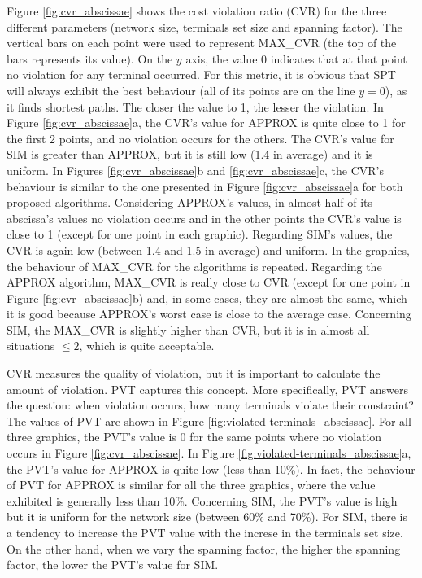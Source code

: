 
Figure \ref{fig:cvr_abscissae} shows the cost violation ratio (CVR) for the three different parameters
(network size, terminals set size and spanning factor). The vertical bars on each point were used to represent MAX\_CVR
(the top of the bars represents its value). On the $y$ axis, the value 0 indicates that at that point no violation for any terminal occurred. 
For this metric, it is obvious that SPT will always exhibit the best behaviour (all of its points are on the line $y = 0$), 
as it finds shortest paths. The closer the value to 1, the lesser the violation. 
In Figure \ref{fig:cvr_abscissae}a, the CVR's value for APPROX is quite close to 1 for the first 2 points, 
and no violation occurs for the others. 
The CVR's value for SIM is greater than APPROX, but it is still low (1.4 in average) and it is uniform. In Figures \ref{fig:cvr_abscissae}b and \ref{fig:cvr_abscissae}c, 
the CVR's behaviour is similar to the one presented in Figure \ref{fig:cvr_abscissae}a for both proposed algorithms. Considering APPROX's values, 
in almost half of its abscissa's values no violation occurs and in the other points the CVR's value is close to 1 (except for one point in each graphic). 
Regarding SIM's values, the CVR is again low (between 1.4 and 1.5 in average) and uniform. In the graphics, the behaviour of MAX\_CVR for the algorithms is repeated. 
Regarding the APPROX algorithm, MAX\_CVR is really close to CVR (except for one point in Figure \ref{fig:cvr_abscissae}b) and, in some cases, they are 
almost the same, which it is good because APPROX's worst case is close to the average case. Concerning SIM, the MAX\_CVR is slightly 
higher than CVR, but it is in almost all situations $\le 2$, which is quite acceptable.

CVR measures the quality of violation, but it is important to calculate the amount of violation. PVT 
captures this concept. More specifically, PVT answers the question: when violation occurs, how many terminals violate their constraint? 
The values of PVT are shown in Figure \ref{fig:violated-terminals_abscissae}. 
For all three graphics, the PVT's value is 0 for the same points where no violation 
occurs in Figure \ref{fig:cvr_abscissae}. In Figure \ref{fig:violated-terminals_abscissae}a, the PVT's value for APPROX is quite low (less than 10\%). In fact, 
the behaviour of PVT for APPROX is similar for all the three graphics, where the value exhibited is generally less than 10\%. Concerning SIM, the PVT's value 
is high but it is uniform for the network size (between 60\% and 70\%). 
For SIM, there is a tendency to increase the PVT value with the increse in the terminals set size.
On the other hand, when we vary the spanning factor, the higher the spanning factor, the lower the PVT's value for SIM.

